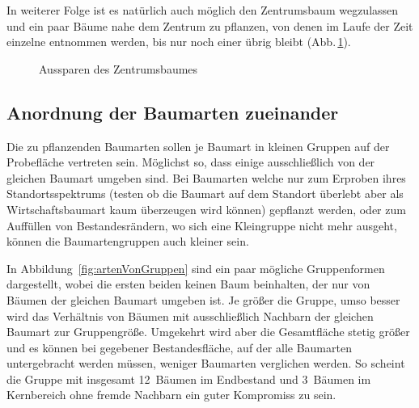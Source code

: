 \documentclass[twocolumn]{scrartcl}
\begin{document}
In weiterer Folge ist es natürlich auch möglich den Zentrumsbaum wegzulassen und
ein paar Bäume nahe dem Zentrum zu pflanzen, von denen im Laufe der Zeit
einzelne entnommen werden, bis nur noch einer übrig bleibt
(Abb.\,\ref{fig:keinZentrumsbaum}).

\begin{figure}[htbp]
  \centering
{}
\caption{Aussparen des Zentrumsbaumes}
\label{fig:keinZentrumsbaum}
\end{figure}

\subsection{Anordnung der Baumarten zueinander}

Die zu pflanzenden Baumarten sollen je Baumart in kleinen Gruppen auf der
Probefläche vertreten sein. Möglichst so, dass einige ausschließlich von der
gleichen Baumart umgeben sind. Bei Baumarten welche nur zum Erproben ihres
Standortsspektrums (testen ob die Baumart auf dem Standort überlebt aber als
Wirtschaftsbaumart kaum überzeugen wird können) gepflanzt werden, oder zum
Auffüllen von Bestandesrändern, wo sich eine Kleingruppe nicht mehr ausgeht,
können die Baumartengruppen auch kleiner sein.

In Abbildung~\ref{fig:artenVonGruppen} sind ein paar mögliche Gruppenformen
dargestellt, wobei die ersten beiden keinen Baum beinhalten, der nur von Bäumen
der gleichen Baumart umgeben ist. Je größer die Gruppe, umso besser wird das
Verhältnis von Bäumen mit ausschließlich Nachbarn der gleichen Baumart zur
Gruppengröße. Umgekehrt wird aber die Gesamtfläche stetig größer und es können
bei gegebener Bestandesfläche, auf der alle Baumarten untergebracht werden
müssen, weniger Baumarten verglichen werden. So scheint die Gruppe mit insgesamt
12~Bäumen im Endbestand und 3~Bäumen im Kernbereich ohne fremde Nachbarn ein
guter Kompromiss zu sein.
\end{document}
